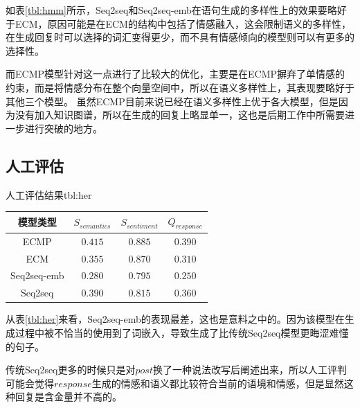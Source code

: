 \documentclass[supercite]{HustGraduPaper}
\theoremstyle{definition}
\begin{document}
如表\ref{tbl:hmm}所示，Seq2seq和Seq2seq-emb在语句生成的多样性上的效果要略好于ECM，原因可能是在ECM的结构中包括了情感融入，这会限制语义的多样性，
在生成回复时可以选择的词汇变得更少，而不具有情感倾向的模型则可以有更多的选择性。

而ECMP模型针对这一点进行了比较大的优化，主要是在ECMP摒弃了单情感的约束，而是将情感分布在整个向量空间中，所以在语义多样性上，其表现要略好于其他三个模型。
虽然ECMP目前来说已经在语义多样性上优于各大模型，但是因为没有加入知识图谱，所以在生成的回复上略显单一，这也是后期工作中所需要进一步进行突破的地方。


\subsection{人工评估}

\begin{generaltab}{人工评估结果}{tbl:her}
  \begin{tabular}{c|ccc}
    \toprule
    模型类型 & $S_{semantics}$ & $S_{sentiment}$ & $Q_{response}$\\
    \midrule
    ECMP & $0.415$ & $0.885$ & $0.390$\\
    ECM & $0.355$ & $0.870$ & $0.310$\\
    Seq2seq-emb & $0.280$ & $0.795$ & $0.250$\\
    Seq2seq & $0.390$ & $0.815$ & $0.360$\\
    \bottomrule
  \end{tabular}
\end{generaltab}
从表\ref{tbl:her}来看，Seq2seq-emb的表现最差，这也是意料之中的。因为该模型在生成过程中被不恰当的使用到了词嵌入，导致生成了比传统Seq2seq模型更晦涩难懂的句子。

传统Seq2seq更多的时候只是对$post$换了一种说法改写后阐述出来，所以人工评判可能会觉得$response$生成的情感和语义都比较符合当前的语境和情感，但是显然这种回复是含金量并不高的。
\end{document}
